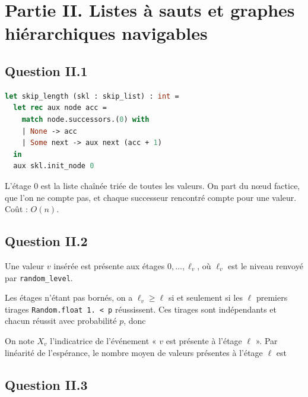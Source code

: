 \documentclass[11pt,a4paper]{article}
\renewcommand{\geq}{\geqslant}
\newcommand{\equationajustee}[1]{%
  \sbox{\boiteequation}{$\displaystyle #1$}%
  \ifdim\wd\boiteequation>\linewidth
    \[\resizebox{\linewidth}{!}{\usebox{\boiteequation}}\]%
  \else
    \[#1\]%
  \fi}
\begin{document}
\hypertarget{partie-ii.-listes-uxe0-sauts-et-graphes-hiuxe9rarchiques-navigables}{%
\section{Partie II. Listes à sauts et graphes hiérarchiques navigables}\label{partie-ii.-listes-uxe0-sauts-et-graphes-hiuxe9rarchiques-navigables}}

\hypertarget{question-ii.1}{%
\subsection{Question II.1}\label{question-ii.1}}

\begin{lstlisting}[language=Caml]
let skip_length (skl : skip_list) : int =
  let rec aux node acc =
    match node.successors.(0) with
    | None -> acc
    | Some next -> aux next (acc + 1)
  in
  aux skl.init_node 0
\end{lstlisting}

L'étage 0 est la liste chaînée triée de toutes les valeurs. On part du nœud factice, que l'on ne compte pas, et chaque successeur rencontré compte pour une valeur. Coût : \(O(n)\).

\hypertarget{question-ii.2}{%
\subsection{Question II.2}\label{question-ii.2}}

Une valeur \(v\) insérée est présente aux étages \(0,\dots,\ell_v\), où \(\ell_v\) est le niveau renvoyé par \texttt{random\_level}.

Les étages n'étant pas bornés, on a \(\ell_v\geq\ell\) si et seulement si les \(\ell\) premiers tirages \texttt{Random.float\ 1.\ \textless{}\ p} réussissent. Ces tirages sont indépendants et chacun réussit avec probabilité \(p\), donc

\equationajustee{\Pr(\ell_v\geq\ell)=p^\ell.}

On note \(X_v\) l'indicatrice de l'événement « \(v\) est présente à l'étage \(\ell\) ». Par linéarité de l'espérance, le nombre moyen de valeurs présentes à l'étage \(\ell\) est

\equationajustee{\boxed{\mathbb E\Big[\sum_v X_v\Big]=n\,p^{\ell}.}}

\hypertarget{question-ii.3}{%
\subsection{Question II.3}\label{question-ii.3}}
\end{document}
